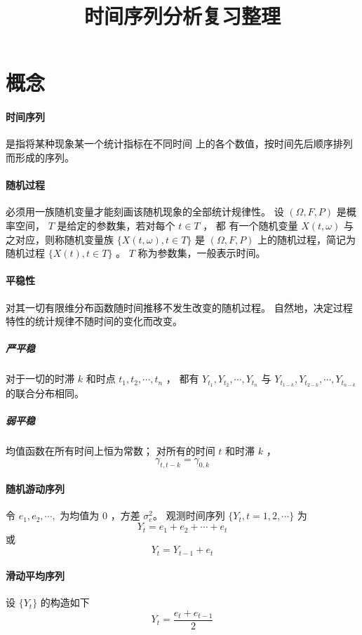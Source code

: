 \documentclass[UTF8,hyperref,a4paper]{ctexart}
\title{\textbf{时间序列分析复习整理}}
\author{\fangsong{胡奕公}}
\date{\kaishu{2018年9月22日}}
\begin{document}
        \maketitle

        \section{概念}

        \paragraph{时间序列} 是指将某种现象某一个统计指标在不同时间
        上的各个数值，按时间先后顺序排列而形成的序列。

        \paragraph{随机过程}必须用一族随机变量才能刻画该随机现象的全部统计规律性。 
        设 $ (\Omega, F, P) $ 是概率空间， $ T $ 是给定的参数集，若对每个 $ t \in T $ ，
        都 有一个随机变量  $ X(t,\omega) $ 与之对应，则称随机变量族  $ \{ X(t,\omega), t \in T \} $ 
        是 $ (\Omega, F, P) $ 上的随机过程，简记为随机过程 $ \{ X(t), t \in T \} $ 。
        $ T $ 称为参数集，一般表示时间。

        \paragraph{平稳性} 对其一切有限维分布函数随时间推移不发生改变的随机过程。
        自然地，决定过程特性的统计规律不随时间的变化而改变。

        \subparagraph{严平稳} 对于一切的时滞 $ k $ 和时点 $ t_1, t_2, \cdots, t_n $ ，
        都有 $ Y_{t_1}, Y_{t_2},  \cdots, Y_{t_n} $ 与
        $ Y_{t_{1−k}}, Y_{t_{2−k}}, \cdots, Y_{t_{n−k}}  $ 的联合分布相同。

        \subparagraph{弱平稳} 均值函数在所有时间上恒为常数；
        对所有的时间 $ t $ 和时滞  $ k $ ， $$ \gamma_{t,t-k} = \gamma_{0,k} $$

        \paragraph{随机游动序列} 令 $ e_1, e_2, \cdots,  $ 为均值为 $ 0 $ ，方差 $ \sigma_e^2 $。
        观测时间序列 $ \{ Y_t, t = 1,2,\cdots \} $ 为 $$ Y_t = e_1 + e_2 + \cdots + e_t $$ 
        或 $$ Y_t = Y_{t-1} + e_t $$ 

        \paragraph{滑动平均序列} 设 $ \{Y_t\} $  的构造如下
        $$ Y_t = \frac{e_t + e_{t-1}}{2} $$ 
\end{document}
